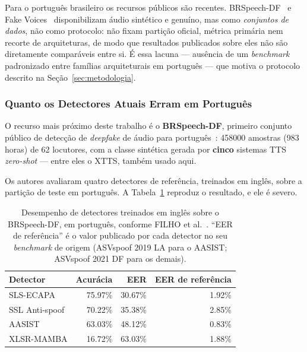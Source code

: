 \documentclass[12pt,a4paper]{article}
\begin{document}
Para o português brasileiro os recursos públicos são recentes.
BRSpeech-DF~\cite{brspeechdf_card} e Fake Voices~\cite{fakevoices_card}
disponibilizam áudio sintético e genuíno, mas como \emph{conjuntos de dados}, não
como protocolo: não fixam partição oficial, métrica primária nem recorte de
arquiteturas, de modo que resultados publicados sobre eles não são diretamente
comparáveis entre si. É essa lacuna --- ausência de um \textit{benchmark}
padronizado entre famílias arquiteturais em português --- que motiva o protocolo
descrito na Seção~\ref{sec:metodologia}.

\subsubsection*{Quanto os Detectores Atuais Erram em Português}

O recurso mais próximo deste trabalho é o \textbf{BRSpeech-DF}, primeiro
conjunto público de detecção de \textit{deepfake} de áudio para
português~\cite{brspeechdf2025}: \num{458000} amostras (\num{983} horas) de
\num{62} locutores, com a classe sintética gerada por \textbf{cinco}
sistemas TTS \textit{zero-shot} --- entre eles o XTTS, também usado aqui.

Os autores avaliaram quatro detectores de referência, treinados em inglês, sobre
a partição de teste em português. A Tabela~\ref{tab:brspeech_eer} reproduz o
resultado, e ele é severo.

\begin{table}[H]
	\centering
	\caption[Desempenho de detectores treinados em inglês sobre o BRSpeech-DF.]{Desempenho de detectores treinados em inglês sobre o BRSpeech-DF, em
		português, conforme FILHO et al.~\cite{brspeechdf2025}. ``EER de referência''
		é o valor publicado por cada detector no seu \textit{benchmark} de origem
		(ASVspoof 2019 LA para o AASIST; ASVspoof 2021 DF para os demais).}
	\label{tab:brspeech_eer}
	\small\singlespacing
	\begin{tabular}{@{}lrrr@{}}
		\toprule
		\textbf{Detector} & \textbf{Acurácia} & \textbf{EER} &
		\textbf{EER de referência} \\
		\midrule
		SLS-ECAPA      & \num{75,97}\% & \num{30,67}\% & \num{1,92}\% \\
		SSL Anti-spoof & \num{70,22}\% & \num{35,38}\% & \num{2,85}\% \\
		AASIST         & \num{63,03}\% & \num{48,12}\% & \num{0,83}\% \\
		XLSR-MAMBA     & \num{16,72}\% & \num{63,03}\% & \num{1,88}\% \\
		\bottomrule
	\end{tabular}
\end{table}
\end{document}
